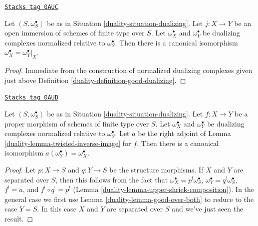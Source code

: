 \begin{lemma}
\label{duality-lemma-open-immersion-good-dualizing-complex}
\href{https://stacks.math.columbia.edu/tag/0AUC}{\texttt{Stacks tag 0AUC}}

Let $(S, \omega_S^\bullet)$ be as in Situation \ref{duality-situation-dualizing}.
Let $j : X \to Y$ be an open immersion of schemes of finite type over $S$.
Let $\omega_X^\bullet$ and $\omega_Y^\bullet$ be dualizing complexes
normalized relative to $\omega_S^\bullet$. Then there is a canonical
isomorphism $\omega_X^\bullet = \omega_Y^\bullet|_X$.
\end{lemma}

\begin{proof}

Immediate from the construction of normalized dualizing complexes
given just above
Definition \ref{duality-definition-good-dualizing}.
\end{proof}

\begin{lemma}
\label{duality-lemma-proper-map-good-dualizing-complex}
\href{https://stacks.math.columbia.edu/tag/0AUD}{\texttt{Stacks tag 0AUD}}

Let $(S, \omega_S^\bullet)$ be as in Situation \ref{duality-situation-dualizing}.
Let $f : X \to Y$ be a proper morphism of schemes of finite type over $S$.
Let $\omega_X^\bullet$ and $\omega_Y^\bullet$ be dualizing complexes
normalized relative to $\omega_S^\bullet$. Let $a$ be the
right adjoint of Lemma \ref{duality-lemma-twisted-inverse-image} for
$f$. Then there is a canonical isomorphism
$a(\omega_Y^\bullet) = \omega_X^\bullet$.
\end{lemma}

\begin{proof}

Let $p : X \to S$ and $q : Y \to S$ be the structure morphisms.
If $X$ and $Y$ are separated over $S$, then this follows
from the fact that $\omega_X^\bullet = p^!\omega_S^\bullet$,
$\omega_Y^\bullet = q^!\omega_S^\bullet$, $f^! = a$, and
$f^! \circ q^! = p^!$ (Lemma \ref{duality-lemma-upper-shriek-composition}).
In the general case we first use Lemma \ref{duality-lemma-good-over-both}
to reduce to the case $Y = S$. In this case $X$ and $Y$
are separated over $S$ and we've just seen the result.
\end{proof}

